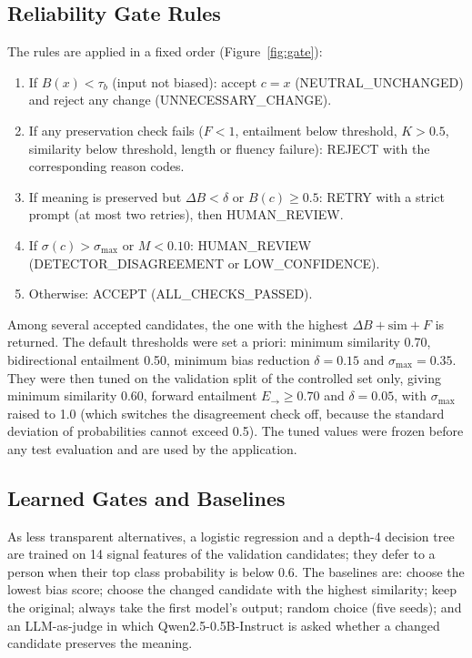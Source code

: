 \documentclass[12pt,a4paper,oneside]{report}
\begin{document}
\subsection{Reliability Gate Rules}
The rules are applied in a fixed order (Figure~\ref{fig:gate}):
\begin{enumerate}
\item If $B(x)<\tau_b$ (input not biased): accept $c=x$ (NEUTRAL\_UNCHANGED) and reject any change
(UNNECESSARY\_CHANGE).
\item If any preservation check fails ($F<1$, entailment below threshold, $K>0.5$, similarity below threshold, length
or fluency failure): REJECT with the corresponding reason codes.
\item If meaning is preserved but $\Delta B<\delta$ or $B(c)\ge 0.5$: RETRY with a strict prompt (at most two retries),
then HUMAN\_REVIEW.
\item If $\sigma(c)>\sigma_{\max}$ or $M<0.10$: HUMAN\_REVIEW (DETECTOR\_DISAGREEMENT or LOW\_CONFIDENCE).
\item Otherwise: ACCEPT (ALL\_CHECKS\_PASSED).
\end{enumerate}
Among several accepted candidates, the one with the highest $\Delta B+\text{sim}+F$ is returned. The default thresholds
were set a priori: minimum similarity 0.70, bidirectional entailment 0.50, minimum bias reduction $\delta=0.15$ and
$\sigma_{\max}=0.35$. They were then tuned on the validation split of the controlled set only, giving minimum
similarity 0.60, forward entailment $E_{\rightarrow}\ge0.70$ and $\delta=0.05$, with $\sigma_{\max}$ raised to 1.0
(which switches the disagreement check off, because the standard deviation of probabilities cannot exceed 0.5). The
tuned values were frozen before any test evaluation and are used by the application.

\subsection{Learned Gates and Baselines}
As less transparent alternatives, a logistic regression and a depth-4 decision tree are trained on 14 signal features of
the validation candidates; they defer to a person when their top class probability is below 0.6. The baselines are:
choose the lowest bias score; choose the changed candidate with the highest similarity; keep the original; always take
the first model's output; random choice (five seeds); and an LLM-as-judge in which Qwen2.5-0.5B-Instruct is asked whether
a changed candidate preserves the meaning.
\end{document}
